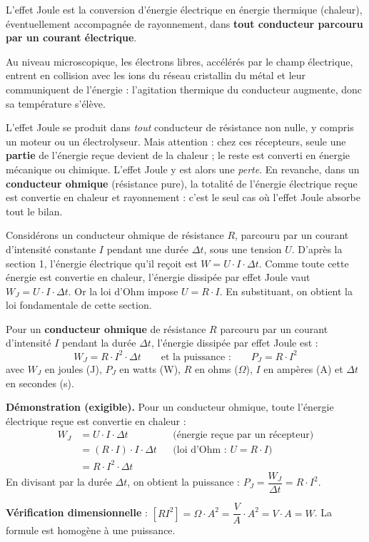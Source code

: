 \documentclass[11pt]{article}
\newcommand{\cle}[1]{{\popxbold\color{popdark}#1}}
\newcounter{popsec}
\newcounter{popsub}
\newcommand{\courssub}[1]{%
  \stepcounter{popsub}%
  \par\vspace{9pt}\noindent{\popxbold\fontsize{11.5}{13}\selectfont\color{popink}{\color{poporange}\thepopsec.\thepopsub}\hspace{6pt}#1}\par\nopagebreak\vspace{4pt}
}
\begin{document}
\begin{definition}
L'\cle{effet Joule} est la conversion d'énergie électrique en énergie thermique (chaleur), éventuellement accompagnée de rayonnement, dans \textbf{tout conducteur parcouru par un courant électrique}.

Au niveau microscopique, les électrons libres, accélérés par le champ électrique, entrent en collision avec les ions du réseau cristallin du métal et leur communiquent de l'énergie : l'agitation thermique du conducteur augmente, donc sa température s'élève.
\end{definition}

\begin{attention}
L'effet Joule se produit dans \emph{tout} conducteur de résistance non nulle, y compris un moteur ou un électrolyseur. Mais attention : chez ces récepteurs, seule une \textbf{partie} de l'énergie reçue devient de la chaleur ; le reste est converti en énergie mécanique ou chimique. L'effet Joule y est alors une \emph{perte}. En revanche, dans un \textbf{conducteur ohmique} (résistance pure), la totalité de l'énergie électrique reçue est convertie en chaleur et rayonnement : c'est le seul cas où l'effet Joule absorbe tout le bilan.
\end{attention}

\courssub{La loi de Joule}

Considérons un conducteur ohmique de résistance $R$, parcouru par un courant d'intensité constante $I$ pendant une durée $\Delta t$, sous une tension $U$. D'après la section 1, l'énergie électrique qu'il reçoit est $W = U \cdot I \cdot \Delta t$. Comme toute cette énergie est convertie en chaleur, l'énergie dissipée par effet Joule vaut $W_J = U \cdot I \cdot \Delta t$. Or la loi d'Ohm impose $U = R \cdot I$. En substituant, on obtient la loi fondamentale de cette section.

\begin{propriete}
Pour un \textbf{conducteur ohmique} de résistance $R$ parcouru par un courant d'intensité $I$ pendant la durée $\Delta t$, l'énergie dissipée par effet Joule est :
\[ W_J = R \cdot I^2 \cdot \Delta t \qquad \text{et la puissance :} \qquad P_J = R \cdot I^2 \]
avec $W_J$ en joules (J), $P_J$ en watts (W), $R$ en ohms ($\Omega$), $I$ en ampères (A) et $\Delta t$ en secondes (s).

\textbf{Démonstration (exigible).} Pour un conducteur ohmique, toute l'énergie électrique reçue est convertie en chaleur :
\begin{align*}
W_J &= U \cdot I \cdot \Delta t & &\text{(énergie reçue par un récepteur)}\\
&= (R \cdot I) \cdot I \cdot \Delta t & &\text{(loi d'Ohm : } U = R \cdot I\text{)}\\
&= R \cdot I^2 \cdot \Delta t
\end{align*}
En divisant par la durée $\Delta t$, on obtient la puissance : $P_J = \dfrac{W_J}{\Delta t} = R \cdot I^2$.

\textbf{Vérification dimensionnelle} : $[R I^2] = \Omega \cdot A^2 = \dfrac{V}{A} \cdot A^2 = V \cdot A = W$. La formule est homogène à une puissance.
\end{propriete}
\end{document}
